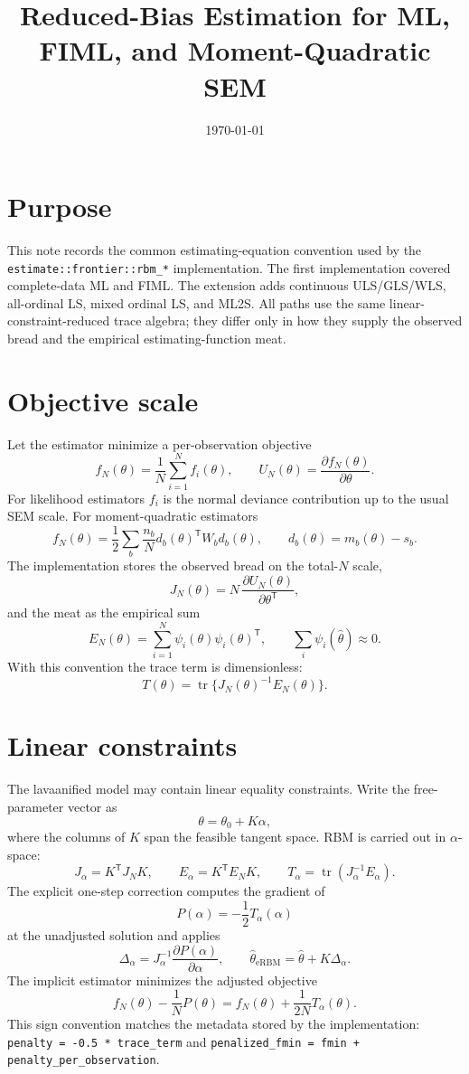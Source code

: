 \documentclass[11pt]{article}
\title{Reduced-Bias Estimation for ML, FIML, and Moment-Quadratic SEM}
\author{}
\date{\today}
\newcommand{\T}{^{\mathsf T}}
\newcommand{\tr}{\operatorname{tr}}
\newcommand{\hatth}{\widehat\theta}
\begin{document}
\maketitle

\section*{Purpose}

This note records the common estimating-equation convention used by the
\texttt{estimate::frontier::rbm\_*} implementation. The first implementation
covered complete-data ML and FIML. The extension adds continuous ULS/GLS/WLS,
all-ordinal LS, mixed ordinal LS, and ML2S. All paths use the same
linear-constraint-reduced trace algebra; they differ only in how they supply
the observed bread and the empirical estimating-function meat.

\section*{Objective scale}

Let the estimator minimize a per-observation objective
\[
  f_N(\theta) = \frac{1}{N}\sum_{i=1}^N f_i(\theta),
  \qquad
  U_N(\theta) = \frac{\partial f_N(\theta)}{\partial \theta}.
\]
For likelihood estimators \(f_i\) is the normal deviance contribution up to the
usual SEM scale. For moment-quadratic estimators
\[
  f_N(\theta)
    =
  \frac12 \sum_b \frac{n_b}{N}
    d_b(\theta)\T W_b d_b(\theta),
  \qquad
  d_b(\theta) = m_b(\theta) - s_b .
\]
The implementation stores the observed bread on the total-\(N\) scale,
\[
  J_N(\theta) =
    N\,\frac{\partial U_N(\theta)}{\partial\theta\T},
\]
and the meat as the empirical sum
\[
  E_N(\theta) = \sum_{i=1}^N \psi_i(\theta)\psi_i(\theta)\T,
  \qquad
  \sum_i \psi_i(\hatth) \approx 0 .
\]
With this convention the trace term is dimensionless:
\[
  T(\theta) = \tr\{J_N(\theta)^{-1}E_N(\theta)\}.
\]

\section*{Linear constraints}

The lavaanified model may contain linear equality constraints. Write the
free-parameter vector as
\[
  \theta = \theta_0 + K\alpha,
\]
where the columns of \(K\) span the feasible tangent space. RBM is carried out
in \(\alpha\)-space:
\[
  J_\alpha = K\T J_N K,
  \qquad
  E_\alpha = K\T E_N K,
  \qquad
  T_\alpha = \tr(J_\alpha^{-1}E_\alpha).
\]
The explicit one-step correction computes the gradient of
\[
  P(\alpha) = -\frac12 T_\alpha(\alpha)
\]
at the unadjusted solution and applies
\[
  \Delta_\alpha = J_\alpha^{-1}
    \frac{\partial P(\alpha)}{\partial\alpha},
  \qquad
  \hat\theta_{\mathrm{eRBM}} =
    \hat\theta + K\Delta_\alpha .
\]
The implicit estimator minimizes the adjusted objective
\[
  f_N(\theta) - \frac{1}{N}P(\theta)
    =
  f_N(\theta) + \frac{1}{2N}T_\alpha(\theta).
\]
This sign convention matches the metadata stored by the implementation:
\texttt{penalty = -0.5 * trace\_term} and
\texttt{penalized\_fmin = fmin + penalty\_per\_observation}.
\end{document}
